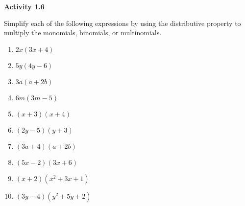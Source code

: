 \vspace{1ex}
\noindent\textbf{Activity 1.6}


Simplify each of the following expressions by using the distributive property to multiply the monomials, binomials, or multinomials.
\begin{multicols}{2}
\begin{enumerate}
    \item \( 2x(3x + 4) \)
    \item \( 5y(4y - 6) \)
    \item \( 3a(a + 2b) \)
    \item \( 6m(3m - 5) \)
    \item \( (x + 3)(x + 4) \)
    \item \( (2y - 5)(y + 3) \)
    \item \( (3a + 4)(a + 2b) \)
    \item \( (5x - 2)(3x + 6) \)
    \item \( (x + 2)(x^2 + 3x + 1) \)
    \item \( (3y - 4)(y^2 + 5y + 2) \)
\end{enumerate}
\end{multicols} 